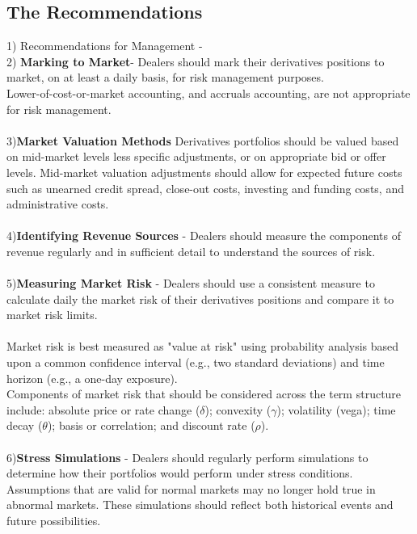 \documentclass[12pt, a4paper]{report}
\begin{document}
\subsection{The Recommendations}
1) Recommendations for Management -
\\
2) \textbf{Marking to Market}-  Dealers should mark their
derivatives positions to market, on at least a daily basis, for
risk management purposes.
\\ Lower-of-cost-or-market accounting, and accruals
accounting, are not appropriate for risk management.
\\\\3)\textbf{Market Valuation Methods}
Derivatives portfolios should be valued based on mid-market levels
less specific adjustments, or on appropriate bid or offer levels.
Mid-market valuation adjustments should allow for expected future
costs such as unearned credit spread, close-out costs, investing
and funding costs, and administrative costs.
\\\\4)\textbf{Identifying Revenue Sources }- Dealers should measure the components of revenue regularly and in
sufficient detail to understand the sources of risk.
\\\\
5)\textbf{Measuring Market Risk} - Dealers should use a consistent
measure to calculate daily the market risk of their derivatives
positions and compare it to market risk limits.\\\\\indent Market
risk is best measured as "value at risk" using probability
analysis based upon a common confidence interval (e.g., two
standard deviations) and time horizon (e.g., a one-day exposure).
\\\indent Components of market risk that should be considered
across the term structure include: absolute price or rate change
($\delta$); convexity ($\gamma$); volatility (vega); time decay
($\theta$); basis or correlation; and discount rate ($\rho$).
\\\\
6)\textbf{Stress Simulations} -  Dealers should regularly perform
simulations to determine how their portfolios would perform under
stress conditions.
\\
Assumptions that are valid for normal markets may no longer hold
true in abnormal markets. These simulations should reflect both
historical events and future possibilities.
\\\\
\end{document}
